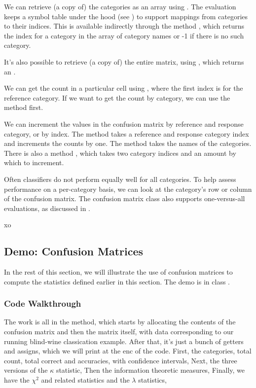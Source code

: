 We can retrieve (a copy of) the categories as an array using
.  The evaluation keeps a symbol table under the
hood (see ) to support mappings from categories
to their indices.  This is available indirectly through the method
, which returns the index for a category in the
array of category names or -1 if there is no such category.

It's also possible to retrieve (a copy of) the entire matrix, using
, which returns an .  

We can get the count in a particular cell using ,
where the first index is for the reference category.  If we want to
get the count by category, we can use the  method
first.

We can increment the values in the confusion matrix by reference and
response category, or by index.  The method 
takes a reference and response category index and increments the
counts by one.  The method  takes
the names of the categories.  There is also a method
, which takes two category indices
and an amount by which to increment.

Often classifiers do not perform equally well for all categories.  To
help assess performance on a per-category basis, we can look at the
category's row or column of the confusion matrix.  The confusion
matrix class also supports one-versus-all evaluations, as
discussed in .


xo\subsection{Demo: Confusion Matrices}\label{section:classifier-eval-confusion-matrix-demo}

In the rest of this section, we will illustrate the use of confusion
matrices to compute the statistics defined earlier in this section.
The demo is in class .

\subsubsection{Code Walkthrough}

The work is all in the  method, which starts by
allocating the contents of the confusion matrix and then the matrix
itself, with data corresponding to our running blind-wine classication
example.
%
%
After that, it's just a bunch of getters and assigns, which we will
print at the enc of the code.  First, the categories, total count,
total correct and accuracies, with confidence intervals,
%
%
Next, the three versions of the $\kappa$ statistic,
%
%
Then the information theoretic measures,
%
%
Finally, we have the $\chi^2$ and related statistics and the $\lambda$ statistics,
%

